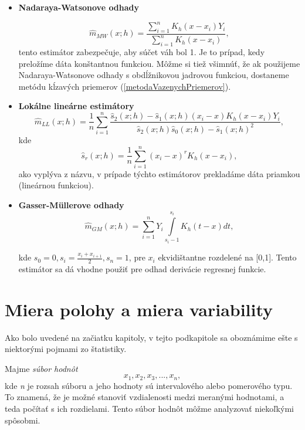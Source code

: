 \begin{itemize}
\item  \textbf{Nadaraya-Watsonove odhady}

\begin{equation}\label{Nadaraya-Watson}
\hat{m}_{MW}(x;h) = \frac{\sum\limits_{i=1}^{n} K_h(x - x_i)Y_i}{\sum\limits_{i=1}^{n} K_h(x - x_i)},
\end{equation}
tento estimátor zabezpečuje, aby súčet váh bol 1. Je to prípad, kedy preložíme dáta konštantnou funkciou. Môžme si tiež všimnúť, že ak použijeme Nadaraya-Watsonove odhady s obdĺžnikovou jadrovou funkciou, dostaneme metódu kĺzavých priemerov (\ref{metodaVazenychPriemerov}).

\item
 \textbf{Lokálne lineárne estimátory}
\begin{equation}
\hat{m}_{LL}(x;h) = \frac{1}{n}\sum\limits_{i=1}^{n}\frac{{\hat{s}_2(x;h) - \hat{s}_1(x;h)(x_i - x)}K_h(x-x_i)Y_i}{\hat{s}_2(x;h)\hat{s}_0(x;h) - \hat{s}_1(x;h)^2},
\end{equation}
kde 
\begin{equation}
\hat{s}_r(x;h) = \frac{1}{n}\sum\limits_{i=1}^{n}(x_i - x)^rK_h(x-x_i),
\end{equation}
ako vyplýva z názvu, v prípade týchto estimátorov prekladáme dáta priamkou (lineárnou funkciou).

\item
\textbf{Gasser-Müllerove odhady}
\begin{equation}
\hat{m}_{GM}(x;h) = \sum\limits_{i=1}^{n} Y_i \int\limits_{s_i-1}^{s_i}K_h(t-x)dt,
\end{equation}

kde $s_0 = 0 , s_i = \frac{x_i + x_{i+1}}{2}, s_n = 1$, pre $x_i$ ekvidištantne rozdelené na [0,1]. Tento estimátor sa dá vhodne použiť pre odhad derivácie regresnej funkcie.

\end{itemize}


\section{Miera polohy a miera variability}
Ako bolo uvedené na začiatku kapitoly, v tejto podkapitole sa oboznámime ešte s niektorými pojmami zo štatistiky.

Majme \textit{súbor hodnôt}
 \begin{equation}
x_1,x_2,x_3,...,x_n,
\end{equation}  
kde \textit{n} je rozsah súboru a jeho hodnoty sú intervalového alebo pomerového typu. To znamená, že je možné  stanoviť vzdialenosti medzi meranými hodnotami, a teda počítať s ich rozdielami. Tento súbor hodnôt môžme analyzovať niekoľkými spôsobmi.

